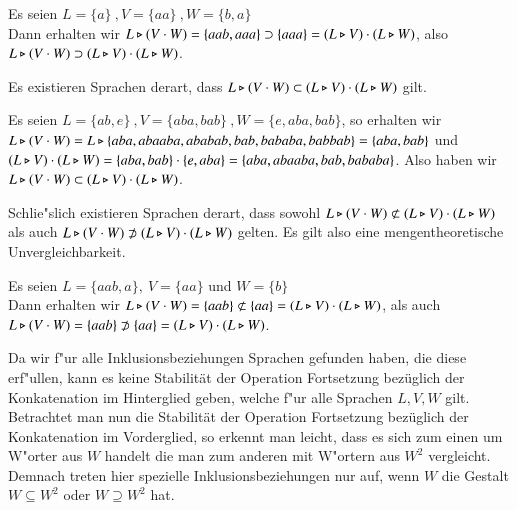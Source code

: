 \vspace{2ex}

\begin{beispiel}
Es seien $L=\{a\}\ ,V=\{aa\}\ ,W=\{b,a\} $\\
Dann erhalten wir $L\triangleright (V\cdot W) = \{aab,aaa\} \supset  \{aaa\} = (L\triangleright V) \cdot (L\triangleright W)$, also $L\triangleright (V\cdot W) \supset (L\triangleright V) \cdot (L\triangleright W)$.
\end{beispiel}
Es existieren Sprachen derart, dass $L\triangleright (V\cdot W) \subset (L\triangleright V)\cdot (L\triangleright W)$ gilt.

\vspace{2ex}

\begin{beispiel}
Es seien  $L=\{ab,e\}\ ,V=\{aba,bab\}\ ,W=\{e,aba,bab\} $, so erhalten wir \\
$L\triangleright (V\cdot W) = L \triangleright \{aba,abaaba,ababab,bab,bababa,babbab\} = \{ aba,bab\}$ und $(L\triangleright V)\cdot (L\triangleright W) = \{aba,bab\} \cdot \{e,aba\} = \{aba,abaaba,bab,bababa\}$. 
Also haben wir $L\triangleright (V\cdot W) \subset (L\triangleright V)\cdot (L\triangleright W)$.
\end{beispiel}
Schlie"slich existieren Sprachen derart, dass sowohl $L\triangleright (V\cdot W) \not\subset (L\triangleright V)\cdot (L\triangleright W)$ als auch $L\triangleright (V\cdot W) \not\supset (L\triangleright V)\cdot (L\triangleright W)$ gelten. Es gilt also eine mengentheoretische Unvergleichbarkeit.

\vspace{2ex}

\begin{beispiel}
Es seien $L=\{aab,a\},\ V=\{aa\}$ und $W=\{b\}$\\
Dann erhalten wir $L\triangleright (V\cdot W) = \{aab\} \not\subset \{aa\} = (L\triangleright V) \cdot (L\triangleright W)$, als auch $L\triangleright (V\cdot W) = \{aab\} \not\supset \{aa\} = (L\triangleright V) \cdot (L\triangleright W)$.
\end{beispiel}

Da wir f"ur alle Inklusionsbeziehungen Sprachen gefunden haben, die diese erf"ullen, kann es keine Stabilität der Operation Fortsetzung bezüglich der Konkatenation im Hinterglied geben, welche f"ur alle Sprachen $L,V,W$ gilt.\\

Betrachtet man nun die Stabilität der Operation Fortsetzung bezüglich der Konkatenation im Vorderglied, so erkennt man leicht, dass es sich 
zum einen um W"orter aus $W$ handelt die man zum anderen mit W"ortern aus $W^2$ vergleicht.\\
Demnach treten hier spezielle Inklusionsbeziehungen nur auf, wenn $W$ die Gestalt $W\subseteq W^2$ oder $W\supseteq W^2$ hat.

